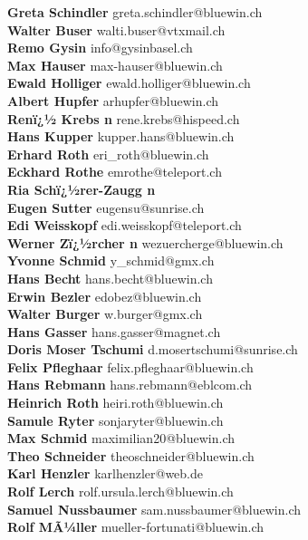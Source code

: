 \documentclass{scrartcl}
\begin{document}
\textbf{Greta Schindler } greta.schindler@bluewin.ch\\
\textbf{Walter Buser } walti.buser@vtxmail.ch\\
\textbf{Remo Gysin } info@gysinbasel.ch\\
\textbf{Max Hauser } max-hauser@bluewin.ch\\
\textbf{Ewald Holliger } ewald.holliger@bluewin.ch\\
\textbf{Albert Hupfer } arhupfer@bluewin.ch\\
\textbf{Renï¿½ Krebs                  n	       } rene.krebs@hispeed.ch\\
\textbf{Hans Kupper } kupper.hans@bluewin.ch\\
\textbf{Erhard Roth } eri_roth@bluewin.ch\\
\textbf{Eckhard Rothe } emrothe@teleport.ch\\
\textbf{Ria Schï¿½rer-Zaugg                  n	    } \\
\textbf{Eugen Sutter } eugensu@sunrise.ch\\
\textbf{Edi Weisskopf } edi.weisskopf@teleport.ch\\
\textbf{Werner Zï¿½rcher                  n	       } wezuercherge@bluewin.ch\\
\textbf{Yvonne Schmid } y_schmid@gmx.ch\\
\textbf{Hans Becht } hans.becht@bluewin.ch\\
\textbf{Erwin Bezler } edobez@bluewin.ch\\
\textbf{Walter Burger } w.burger@gmx.ch\\
\textbf{Hans Gasser } hans.gasser@magnet.ch\\
\textbf{Doris Moser Tschumi } d.mosertschumi@sunrise.ch\\
\textbf{Felix Pfleghaar } felix.pfleghaar@bluewin.ch\\
\textbf{Hans Rebmann } hans.rebmann@eblcom.ch\\
\textbf{Heinrich Roth } heiri.roth@bluewin.ch\\
\textbf{Samule Ryter } sonjaryter@bluewin.ch\\
\textbf{Max Schmid } maximilian20@bluewin.ch\\
\textbf{Theo Schneider } theoschneider@bluewin.ch\\
\textbf{Karl Henzler } karlhenzler@web.de\\
\textbf{Rolf Lerch } rolf.ursula.lerch@bluewin.ch\\
\textbf{Samuel Nussbaumer } sam.nussbaumer@bluewin.ch\\
\textbf{Rolf MÃ¼ller   } mueller-fortunati@bluewin.ch\\
\end{document}

